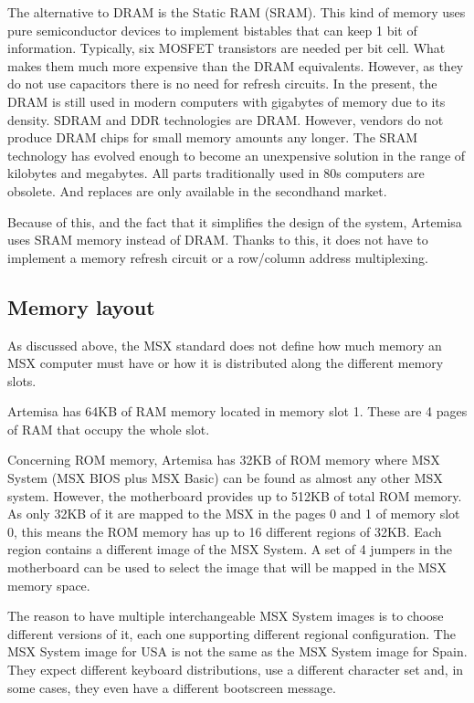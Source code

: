 The alternative to DRAM is the Static RAM (SRAM). This kind of memory uses pure semiconductor devices to implement bistables that can keep 1 bit of information. Typically, six MOSFET transistors are needed per bit cell. What makes them much more expensive than the DRAM equivalents. However, as they do not use capacitors there is no need for refresh circuits.
In the present, the DRAM is still used in modern computers with gigabytes of memory due to its density. SDRAM and DDR technologies are DRAM. However, vendors do not produce DRAM chips for small memory amounts any longer. The SRAM technology has evolved enough to become an unexpensive solution in the range of kilobytes and megabytes. All parts traditionally used in 80s computers are obsolete. And replaces are only available in the secondhand market.

Because of this, and the fact that it simplifies the design of the system, Artemisa uses SRAM memory instead of DRAM. Thanks to this, it does not have to implement a memory refresh circuit or a row/column address multiplexing.

\subsection{Memory layout}

As discussed above, the MSX standard does not define how much memory an MSX computer must have or how it is distributed along the different memory slots.

Artemisa has 64KB of RAM memory located in memory slot 1. These are 4 pages of RAM that occupy the whole slot.

Concerning ROM memory, Artemisa has 32KB of ROM memory where MSX System (MSX BIOS plus MSX Basic) can be found as almost any other MSX system. However, the motherboard provides up to 512KB of total ROM memory. As only 32KB of it are mapped to the MSX in the pages 0 and 1 of memory slot 0, this means the ROM memory has up to 16 different regions of 32KB. Each region contains a different image of the MSX System. A set of 4 jumpers in the motherboard can be used to select the image that will be mapped in the MSX memory space.

The reason to have multiple interchangeable MSX System images is to choose different versions of it, each one supporting different regional configuration. The MSX System image for USA is not the same as the MSX System image for Spain. They expect different keyboard distributions, use a different character set and, in some cases, they even have a different bootscreen message.

